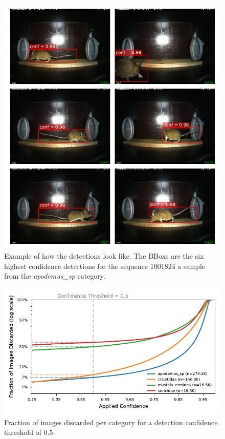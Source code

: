         \begin{figure}[]
        \centering
        \includegraphics{figures/detections_on_a_sequence.pdf}
        \caption{Example of how the detections look like. The \acsp{BBox} are the six highest confidence detections for the sequence 1001824 a sample from the \textit{apodemus\_sp} category.}
        \label{fig:detection_example}
        \end{figure}

        \begin{figure}[ht]
        \centering
        \includegraphics{figures/discarded_img_by_conf.pdf}
        \caption{Fraction of images discarded per category for a detection confidence threshold of 0.5.}
        \label{fig:lost_images}
        \end{figure}        

